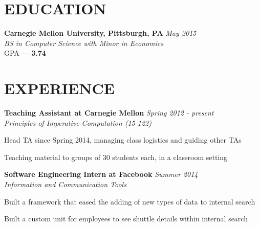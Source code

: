 \documentclass[margin, 11pt]{res} %
\begin{document}
\begin{resume}


\section{EDUCATION}

{\bf Carnegie Mellon University, Pittsburgh, PA} \hfill {\sl May 2015}\\
{\sl BS in Computer Science with Minor in Economics } \\
{\small GPA --- \textbf{3.74}}


 
\section{EXPERIENCE}

{\bf Teaching Assistant at Carnegie Mellon} \hfill {\sl Spring 2012 - present}\\
{\sl Principles of Imperative Computation (15-122)}

\begin{itemize} \itemsep -2pt
{\small \item Head TA since Spring 2014, managing class logistics and guiding other TAs
\item Teaching material to groups of 30 students each, in a classroom setting} 
\end{itemize}

\vspace{3pt}

{\bf Software Engineering Intern at Facebook} \hfill {\sl Summer 2014}\\
{\sl Information and Communication Tools}

\begin{itemize} \itemsep -2pt
{\small 
\item Built a framework that eased the adding of new types of data to internal search
\item Built a custom unit for employees to see shuttle details within internal search 
}
\end{itemize}


\end{resume}
\end{document}

